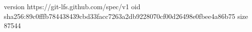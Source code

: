 version https://git-lfs.github.com/spec/v1
oid sha256:89c0fffb784438439cbd33facc7263a2db9228070cf00d26498e0fbee4a86b75
size 87544
